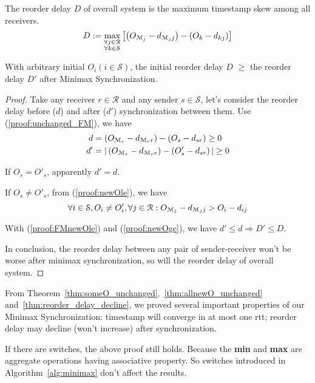 \begin{definition}
	The reorder delay $D$ of overall system is the maximum timestamp skew among all receivers.
	\begin{equation*}
		D:=\max_{\substack{\forall j \in \mathcal{R}\\\forall k \in \mathcal{S}}}\left[\left({O_{{\mathcal{M}_{j}}}-d_{{{\mathcal{M}_{j}}}{j}}}\right)-\left({O_{k}-d_{{k}{j}}}\right)\right]
	\end{equation*}
\end{definition}
\begin{theorem}\label{thm:reorder_delay_decline}
	With arbitrary initial $O_i(i\in \mathcal{S})$, the initial reorder delay $D$ $\ge$ the reorder delay $D'$ after Minimax Synchronization.
\end{theorem}
\begin{proof}
		Take any receiver $r \in \mathcal{R}$ and any sender $s \in \mathcal{S}$, let's consider the reorder delay before ($d$) and after ($d'$) synchronization between them.
		Use (\ref{proof:unchanged_FM}), we have
	\begin{equation*}\begin{split}
		 d &=\left({O_{{\mathcal{M}_{r}}}-d_{{{\mathcal{M}_{r}}}{r}}}\right)-\left({O_{s}-d_{{s}{r}}}\right) \ge 0\\ d'&=|\left({O_{{\mathcal{M}_{r}}}-d_{{{\mathcal{M}_{r}}}{r}}}\right)-\left(O'_s - d_{sr}\right)| \ge 0
	\end{split}\end{equation*}
	
	If $O_s = O'_s$, apparently $d'=d$.
	
	If $O_s \neq O'_s$, from (\ref{proof:newOle}), we have
	$$\forall i \in \mathcal{S}, O_i \neq O'_i, \forall j \in \mathcal{R}:{O_{{\mathcal{M}_{j}}}-d_{{{\mathcal{M}_{j}}}{j}}} > {O_{i}-d_{{i}{j}}}$$
	
	With (\ref{proof:FMnewOle}) and (\ref{proof:newOge}), we have $d' \le d \Rightarrow D' \le D$.
	
	In conclusion, the reorder delay between any pair of sender-receiver won't be worse after minimax synchronization, so will the reorder delay of overall system.
\end{proof}
\begin{rem}
	From Theorem~\ref{thm:someO_unchanged},~\ref{thm:allnewO_unchanged} and~\ref{thm:reorder_delay_decline}, we proved several important properties of our Minimax Synchronization:
	timestamp will converge in at most one rtt; reorder delay may decline (won't increase) after synchronization.
\end{rem}
\begin{note}
	If there are switches, the above proof still holds.
	Because the \textbf{min} and \textbf{max} are aggregate operations having associative property.
	So switches introduced in Algorithm~\ref{alg:minimax} don't affect the results.
\end{note}

